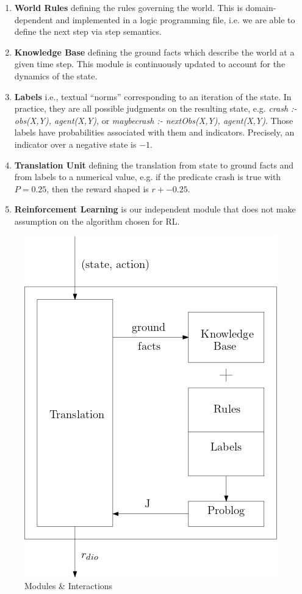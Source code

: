 \begin{multicols}{2}
\begin{enumerate}
  \item \textbf{World Rules} defining the rules governing the world. This is domain-dependent and implemented 
        in a logic programming file, i.e. we are able to define the next step via step semantics.
  \item \textbf{Knowledge Base} defining the ground facts which describe the world at a given time step. This module is 
        continuously updated to account for the dynamics of the
        state.
  \item \textbf{Labels} i.e., textual ``norms'' corresponding to an
  iteration of the state. In practice, they are all possible judgments on the resulting state, e.g. \textit{crash :- obs(X,Y), agent(X,Y)}, 
                  or \textit{maybecrash :- nextObs(X,Y), agent(X,Y)}. 
                    Those labels have probabilities associated with
                    them and indicators. Precisely, an indicator over a negative state is $-1$. 
  \item \textbf{Translation Unit} defining the translation from state to ground facts and from labels to a numerical value, e.g. if the predicate crash is true with $P = 0.25$, then the reward shaped is $r + -0.25$. 
  \item \textbf{Reinforcement Learning} is our independent module that does not make assumption on the algorithm chosen for RL.
\end{enumerate}
\end{multicols}


\begin{figure}[H]
  \centering
  \includegraphics[scale=0.4]{figures/dynamics.png}
  \caption{Modules \& Interactions}
  \label{fig:mods}
\end{figure}

